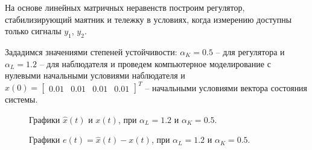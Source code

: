 На основе линейных матричных неравенств построим регулятор, стабилизирующий маятник и тележку в условиях, когда измерению доступны только сигналы $y_1$, $y_2$.

Зададимся значениями степеней устойчивости: $\alpha_K = 0.5$ -- для регулятора и $\alpha_L=1.2$ -- для наблюдателя и проведем компьютерное моделирование с нулевыми начальными условиями наблюдателя и $x(0) = \begin{bmatrix}
    0.01 & 0.01 & 0.01 & 0.01
\end{bmatrix}^T$ -- начальными условиями вектора состояния системы.


\begin{figure}[!h]
\caption{Графики $\hat{x}(t)$ и $x(t)$, при $\alpha_L = 1.2$ и $\alpha_K = 0.5$.}
\label{4_6_1.20.5x}
\end{figure}

\begin{figure}[!h]
\caption{Графики $e(t) = \hat{x}(t)-x(t)$, при $\alpha_L = 1.2$ и $\alpha_K = 0.5$.}
\label{4_6_1.20.5e}
\end{figure}







